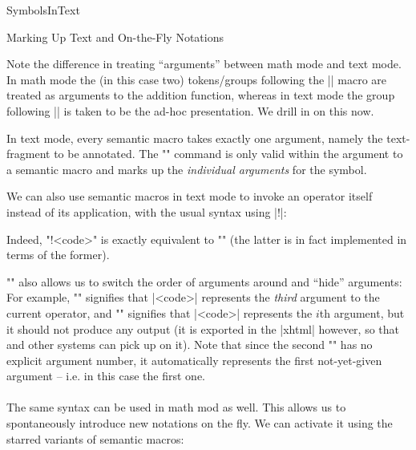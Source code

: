 \begin{smodule}{SymbolsInText}
\begin{sfragment}{Marking Up Text and On-the-Fly Notations}
    \begin{dangerbox}
      Note the difference in treating ``arguments'' between math mode and text mode. In
      math mode the (in this case two) tokens/groups following the \stexcode|\addition|
      macro are treated as arguments to the addition function, whereas in text mode the
      group following \stexcode|\addition| is taken to be the ad-hoc presentation. We
      drill in on this now. 
    \end{dangerbox}
    
    \begin{function}{\arg}
        In text mode, every semantic macro takes exactly one
        argument, namely the text-fragment to be annotated.
        The \stexcode"\arg" command is only valid within the
        argument to a semantic macro and marks up the 
        \emph{individual arguments} for the symbol.
    \end{function}

    We can also use semantic macros in text mode to invoke
    an operator itself instead of its application, with the
    usual syntax using |!|:

    Indeed, \stexcode"\symbolname!{<code>}" is exactly equivalent to
    \stexcode"" (the latter is in fact implemented in terms of
    the former).

    \stexcode"\arg" also allows us to switch the order of arguments
    around and ``hide'' arguments: For example, \stexcode""
    signifies that |<code>| represents the \emph{third}
    argument to the current operator, and \stexcode""
    signifies that |<code>| represents the $i$th argument, but it
    should not produce any output (it is exported in the |xhtml|
    however, so that \mmt and other systems can pick up on it).
    Note that since the second \stexcode"\arg" has no explicit argument
    number, it automatically represents the first not-yet-given
    argument -- i.e. in this case the first one.

    \paragraph{} The same syntax can be used in math mod as well.  This allows us to
    spontaneously introduce new notations on the fly. We can activate it using the starred
    variants of semantic macros:


\end{sfragment}
\end{smodule}


